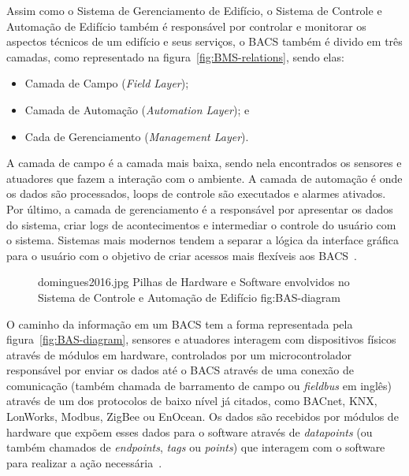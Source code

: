 Assim como o Sistema de Gerenciamento de Edifício, o Sistema de Controle e Automação de Edifício também é responsável por controlar e 
monitorar os aspectos técnicos de um edifício e seus serviços, o BACS também é divido em três camadas, como representado 
na figura~\ref{fig:BMS-relations}, sendo elas:
\begin{itemize}
    \item Camada de Campo (\emph{Field Layer});
    \item Camada de Automação (\emph{Automation Layer}); e 
    \item Cada de Gerenciamento (\emph{Management Layer}).
\end{itemize}
A camada de campo é a camada mais baixa, sendo nela encontrados os sensores e atuadores que fazem a interação com o ambiente. 
A camada de automação é onde os dados são processados, loops de controle são executados e alarmes ativados. Por último, a camada de gerenciamento 
é a responsável por apresentar os dados do sistema, criar logs de acontecimentos e intermediar o controle do usuário com o sistema. 
Sistemas mais modernos tendem a separar a lógica da interface gráfica para o usuário com o objetivo de criar acessos mais flexíveis aos BACS~\cite{Domingues2016}.

\begin{figure}[H]
    {domingues2016.jpg}                 %
    {Pilhas de Hardware e Software envolvidos no Sistema de Controle e Automação de Edifício}     %
    {fig:BAS-diagram}                      %
\end{figure}
O caminho da informação em um BACS tem a forma representada pela figura~\ref{fig:BAS-diagram}, sensores e atuadores interagem com dispositivos 
físicos através de módulos em hardware, controlados por um microcontrolador responsável por enviar os dados até o BACS através de uma conexão 
de comunicação (também chamada de barramento de campo ou \emph{fieldbus} em inglês) através de um dos protocolos de baixo nível já citados, 
como BACnet, KNX, LonWorks, Modbus, ZigBee ou EnOcean. Os dados são recebidos por módulos de hardware que expõem esses dados para o software 
através de \emph{datapoints} (ou também chamados de \emph{endpoints}, \emph{tags} ou \emph{points}) que interagem com o software para realizar 
a ação necessária~\cite{Domingues2016}.
